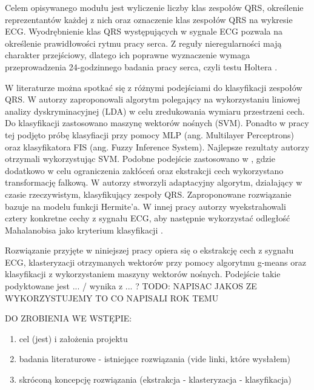 \qquad Celem opisywanego modułu jest wyliczenie liczby klas zespołów QRS, określenie reprezentantów każdej z nich oraz oznaczenie klas zespołów QRS na wykresie ECG. Wyodrębnienie klas QRS występujących w sygnale ECG pozwala na określenie prawidłowości rytmu pracy serca. Z reguły nieregularności mają charakter przejściowy, dlatego ich poprawne wyznaczenie wymaga przeprowadzenia 24-godzinnego badania pracy serca, czyli testu Holtera \cite{RaportKoncowy}.

\qquad W literaturze można spotkać się z różnymi podejściami do klasyfikacji zespołów QRS. W \cite{SVMBasedArrhythmiaClassification} autorzy zaproponowali algorytm polegający na wykorzystaniu liniowej analizy dyskryminacyjnej (LDA) w celu zredukowania wymiaru przestrzeni cech. Do klasyfikacji zastosowano maszynę wektorów nośnych (SVM). Ponadto w pracy tej podjęto próbę klasyfiacji przy pomocy MLP (ang. Multilayer Perceptrons) oraz klasyfikatora FIS (ang. Fuzzy Inference System). Najlepsze rezultaty autorzy otrzymali wykorzystując SVM. Podobne podejście zastosowano w \cite{Abhishek}, gdzie dodatkowo w celu ograniczenia zakłóceń oraz ekstrakcji cech wykorzystano transformację falkową. 
W \cite{Laguna} autorzy stworzyli adaptacyjny algorytm, działający w czasie rzeczywistym, klasyfikujący zespoły QRS. Zaproponowane rozwiązanie bazuje na modelu funkcji Hermite'a. 
W innej pracy autorzy wyekstrahowali cztery konkretne cechy z sygnału ECG, aby następnie wykorzystać odległość Mahalanobisa jako kryterium klasyfikacji \cite{Moreas}.

\qquad Rozwiązanie przyjęte w niniejszej pracy opiera się o ekstrakcję cech z sygnału ECG, klasteryzacji otrzymanych wektorów przy pomocy algorytmu g-means oraz klasyfikacji z wykorzystaniem maszyny wektorów nośnych. Podejście takie podyktowane jest ... / wynika z ... ? TODO: NAPISAC JAKOS ZE WYKORZYSTUJEMY TO CO NAPISALI ROK TEMU


DO ZROBIENIA WE WSTĘPIE:
\begin{enumerate}
	\item cel (jest) i założenia projektu
	\item badania literaturowe - istniejące rozwiązania (vide linki, które wysłałem) 
	\item skróconą koncepcję rozwiązania (ekstrakcja - klasteryzacja - klasyfikacja)
\end{enumerate}